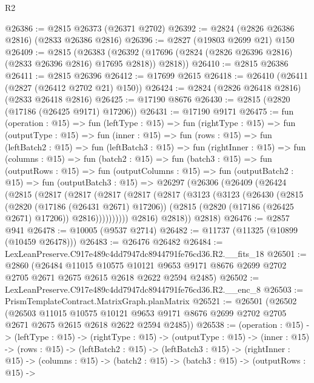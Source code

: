 \begin{lexlean}{R2}
\begin{coremodule}
@26386 := @2815 @26373 (@26371 @2702)
@26392 := @2824 (@2826 @26386 @2816) (@2833 @26386 @2816)
@26396 := @2827 (@19803 @2699 @21) @150
@26409 := @2815
    (@26383 (@26392 (@17696 (@2824 (@2826 @26396 @2816) (@2833 @26396 @2816) @17695 @2818)) @2818))
@26410 := @2815 @26386
@26411 := @2815 @26396
@26412 := @17699 @2615
@26418 := @26410 (@26411 (@2827 (@26412 @2702 @21) @150))
@26424 := @2824 (@2826 @26418 @2816) (@2833 @26418 @2816)
@26425 := @17190 @8676
@26430 := @2815 (@2820 (@17186 (@26425 @9171) @17206))
@26431 := @17190 @9171
@26475 := fun (operation : @15) =>
  fun (leftType : @15) =>
  fun (rightType : @15) =>
  fun (outputType : @15) =>
  fun (inner : @15) =>
  fun (rows : @15) =>
  fun (leftBatch2 : @15) =>
  fun (leftBatch3 : @15) =>
  fun (rightInner : @15) =>
  fun (columns : @15) =>
  fun (batch2 : @15) =>
  fun (batch3 : @15) =>
  fun (outputRows : @15) =>
  fun (outputColumns : @15) =>
  fun (outputBatch2 : @15) =>
  fun (outputBatch3 : @15) =>
  @26297
    (@26306
      (@26409
        (@26424
          (@2815
            (@2817
              (@2817
                (@2817
                  (@2817
                    (@2817
                      (@3123
                        (@3123
                          (@26430
                            (@2815
                              (@2820 (@17186 (@26431 @2671) @17206))
                              (@2815 (@2820 (@17186 (@26425 @2671) @17206)) @2816))))))))))
            @2816)
          @2818))
      @2818)
@26476 := @2857 @941
@26478 := @10005 (@9537 @2714)
@26482 := @11737 (@11325 (@10899 (@10459 @26478)))
@26483 := @26476 @26482
@26484 := LexLeanPreserve.C917e489c4dd7947dc8944791fe76cd36.R2.__fits_18
@26501 := @2860
    (@26484
      @11015
      @10575
      @10121
      @9653
      @9171
      @8676
      @2699
      @2702
      @2705
      @2671
      @2675
      @2615
      @2618
      @2622
      @2594
      @2485)
@26502 := LexLeanPreserve.C917e489c4dd7947dc8944791fe76cd36.R2.__enc_8
@26503 := PrismTemplateContract.MatrixGraph.planMatrix
@26521 := @26501
    (@26502
      (@26503
        @11015
        @10575
        @10121
        @9653
        @9171
        @8676
        @2699
        @2702
        @2705
        @2671
        @2675
        @2615
        @2618
        @2622
        @2594
        @2485))
@26538 := (operation : @15) ->
  (leftType : @15) ->
  (rightType : @15) ->
  (outputType : @15) ->
  (inner : @15) ->
  (rows : @15) ->
  (leftBatch2 : @15) ->
  (leftBatch3 : @15) ->
  (rightInner : @15) ->
  (columns : @15) ->
  (batch2 : @15) ->
  (batch3 : @15) ->
  (outputRows : @15) ->

\end{coremodule}
\end{lexlean}
